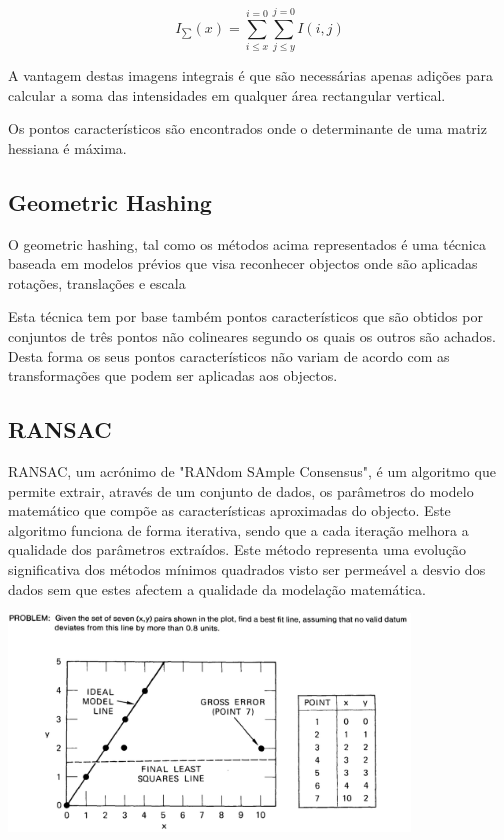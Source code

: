 \[
I_\sum(x) = \sum_{i \leq x}^{i=0} \sum_{j \leq y}^{j=0} I(i,j)
\]


A vantagem destas imagens integrais é que são necessárias apenas adições
para calcular a soma das intensidades em qualquer área rectangular vertical.

Os pontos característicos são encontrados onde o determinante de uma matriz
hessiana é máxima.



\subsection{Geometric Hashing}

O geometric hashing, tal como os métodos acima representados é uma técnica baseada
em modelos prévios que visa reconhecer objectos onde são aplicadas rotações,
translações e escala \cite{1989SPIE.1095..515C}

Esta técnica tem por base também pontos característicos que são obtidos por
conjuntos de três pontos não colineares segundo os quais os outros são achados. 
Desta forma os seus pontos característicos não variam de acordo com as 
transformações que podem ser aplicadas aos objectos.



\subsection{RANSAC}

RANSAC\cite{Fischler:1981:RSC:358669.358692}, um acrónimo de "RANdom SAmple Consensus",
é um algoritmo que permite extrair, através de um conjunto de dados, os parâmetros
do modelo matemático que compõe as características aproximadas do objecto. Este algoritmo 
funciona de forma iterativa, sendo que a cada iteração melhora a qualidade dos parâmetros extraídos.
Este método representa uma evolução significativa dos métodos mínimos quadrados visto ser
permeável a desvio dos dados sem que estes afectem a qualidade da modelação matemática.

\begin{center}
	\includegraphics[width=0.80\textwidth]{figures/least_squares_shortcomings.png}
	\label{fig:ransac}
\end{center}


